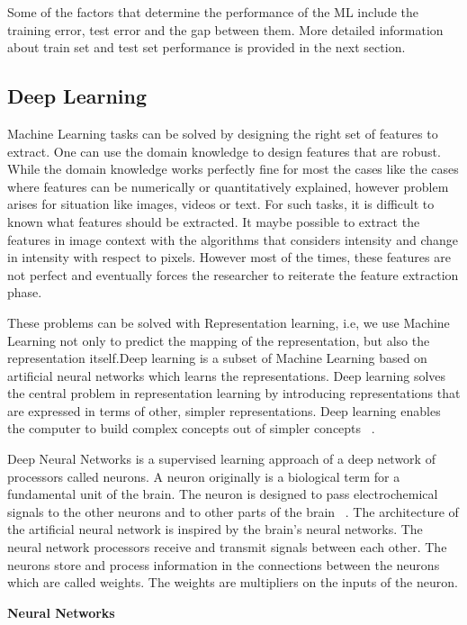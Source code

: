 Some of the factors that determine the performance of the ML include the training error, test error and the gap between them. More detailed information about train set and test set performance is provided in the next section.

\subsection{Deep Learning}
Machine Learning tasks can be solved by designing the right set of features to extract. One can use the domain knowledge to design features that are robust. While the domain knowledge works perfectly fine for most the cases like the cases where features can be numerically or quantitatively explained, however problem arises for situation like images, videos or text. For such tasks, it is difficult to known what features should be extracted. It maybe possible to extract the features in image context with the algorithms that considers intensity and change in intensity with respect to pixels. However most of the times, these features are not perfect and eventually forces the researcher to reiterate the feature extraction phase.

These problems can be solved with Representation learning, i.e, we use Machine Learning not only to predict the mapping of the representation, but also the representation itself.Deep learning is a subset of Machine Learning based on artificial neural networks which learns the representations.
Deep learning solves the central problem in representation learning by introducing representations that are expressed in terms of other, simpler representations. Deep learning enables the computer to build complex concepts out of simpler concepts ~\cite{Goodfellow-et-al-2016}.  

Deep Neural Networks is a supervised learning approach of a deep network of processors called neurons.
A neuron originally is a biological term for a fundamental unit of the brain. The
neuron is designed to pass electrochemical signals to the other neurons and to other parts
of the brain ~\cite{Goodfellow-et-al-2016}. The architecture of the artificial neural network is inspired by the brain's neural networks.
The neural network processors receive and transmit signals between each other. The
neurons store and process information in the connections between the neurons which are
called weights. The weights are multipliers on the inputs of the neuron.
\newline

\noindent \textbf{Neural Networks}
\newline


